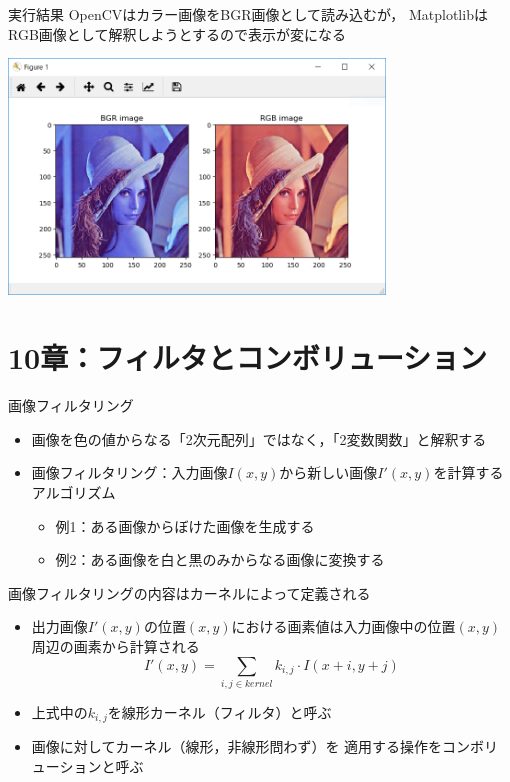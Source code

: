 \documentclass[10pt]{beamer}
\newcommand{\mymain}[1]{\textcolor{mLightBrown}{#1}}
\begin{document}
	\begin{frame}{実行結果}
		OpenCVはカラー画像をBGR画像として読み込むが，
		MatplotlibはRGB画像として解釈しようとするので表示が変になる
		\begin{center}
			\includegraphics[width=10cm]{./figs/bgr_rgb.png}
		\end{center}
	\end{frame}
	
	\section{10章：フィルタとコンボリューション}
	
	\begin{frame}{画像フィルタリング}
		\begin{itemize}
			\item 画像を色の値からなる「2次元配列」ではなく，「2変数関数」と解釈する
			\item 画像フィルタリング：入力画像$I(x, y)$から新しい画像$I'(x, y)$を計算するアルゴリズム
				\begin{itemize}
					\item 例1：ある画像からぼけた画像を生成する
					\item 例2：ある画像を白と黒のみからなる画像に変換する
				\end{itemize}
		\end{itemize}
	\end{frame}
	
	\begin{frame}{画像フィルタリングの内容はカーネルによって定義される}
		\begin{itemize}
			\item 出力画像$I'(x, y)$の位置$(x, y)$における画素値は入力画像中の位置$(x, y)$周辺の画素から計算される
			\[ I'(x, y) = \sum_{i, j \in \mathit{kernel}} k_{i, j} \cdot I(x + i, y + j) \]
			\item 上式中の$k_{i, j}$を\mymain{線形カーネル（フィルタ）}と呼ぶ
			\item 画像に対してカーネル（線形，非線形問わず）を
				適用する操作を\mymain{コンボリューション}と呼ぶ
		\end{itemize}
	\end{frame}
\end{document}
